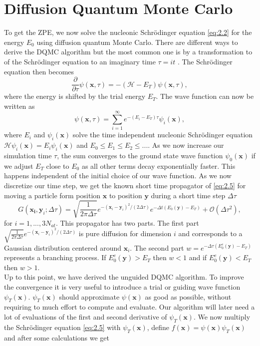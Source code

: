\documentclass [12pt]{report}
\begin{document}
\section{Diffusion Quantum Monte Carlo}
To get the ZPE, we now solve the nucleonic Schrödinger equation \eqref{eq:2.2} for the energy $E_0$ using diffusion quantum Monte Carlo. There are different ways to derive the DQMC algorithm but the most common one is by a transformation to of the Schrödinger equation to an imaginary time $\tau = it$ \cite{mccoy,cyrus,herleitung2}. The Schrödinger equation then becomes
\begin{equation} \label{eq:2.5}
\frac{\partial}{\partial \tau} \psi(\bm{x},\tau) = -(\mathcal{H} - E_T) \psi(\bm{x},\tau),
\end{equation}
where the energy is shifted by the trial energy $E_T$. The wave function can now be written as
\begin{equation} \label{eq:2.6}
\psi(\bm{x},\tau) = \sum_{i=1}^{\infty} e^{-(E_i - E_T)\tau}\psi_i(\bm{x}),
\end{equation}
where $E_i$ and $\psi_i(\bm{x})$ solve the time independent nucleonic Schrödinger equation $\mathcal{H}\psi_i(\bm{x}) = E_i \psi_i(\bm{x})$ and $E_0 \leq E_1 \leq E_2 \leq...$.
As we now increase our simulation time $\tau$, the sum converges to the ground state wave function $\psi_0(\bm{x})$ if we adjust $E_T$ close to $E_0$ as all other terms decay exponentially faster. This happens independent of the initial choice of our wave function.
As we now discretize our time step, we get the known short time propagator of \eqref{eq:2.5} for moving a particle form position $\bm{x}$ to position $\bm{y}$ during a short time step $\Delta \tau$
\begin{equation} \label{eq:2.7}
G(\bm{x_i},\bm{y}_i;\Delta \tau) = \sqrt{\frac{1}{2 \pi \Delta \tau}} e^{-(\bm{x}_i-\bm{y}_i)^2 /(2 \Delta \tau)} e^{-\Delta t (E_0(\bm{y}) - E_T)} + \mathcal{O}(\Delta \tau^2),
\end{equation}
for $i=1,...,3N_{at}$. This propagator has two parts. The first part $\sqrt{\frac{1}{2 \pi \Delta \tau}} e^{-(\bm{x}_i-\bm{y}_i)^2/(2\Delta \tau)}$ is pure diffusion for dimension $i$ and corresponds to a Gaussian distribution centered around $\bm{x}_i$. The second part $w = e^{-\Delta \tau (E_0^e(\bm{y}) - E_T)}$ represents a branching process. If $E_0^e(\bm{y}) > E_T$ then $w < 1$ and if $E_0^e(\bm{y}) < E_T$ then $w > 1$.\\
Up to this point, we have derived the unguided DQMC algorithm. To improve the convergence it is very useful to introduce a trial or guiding wave function $\psi_T(\bm{x})$. $\psi_T(\bm{x})$ should approximate $\psi(\bm{x})$ as good as possible, without requiring to much effort to compute and evaluate. Our algorithm will later need a lot of evaluations of the first and second derivative of $\psi_T(\bm{x})$. We now multiply the Schrödinger equation \eqref{eq:2.5} with $\psi_T(\bm{x})$, define $f(\bm{x}) = \psi(\bm{x}) \psi_T(\bm{x})$ and after some calculations \cite{cyrus2} we get
\end{document}
